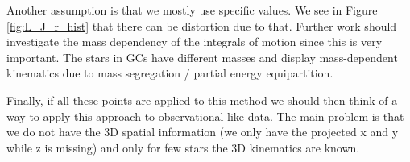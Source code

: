 \par Another assumption is that we mostly use specific values. We see in Figure \ref{fig:L_J_r_hist} that there can be distortion due to that. Further work should investigate the mass dependency of the integrals of motion since this is very important. The stars in \acp{GC} have different masses and display mass-dependent kinematics due to mass segregation / partial energy equipartition.
\par Finally, if all these points are applied to this method we should then think of a way to apply this approach to observational-like data. The main problem is that we do not have the 3D spatial information (we only have the projected x and y while z is missing) and only for few stars the 3D kinematics are known.
